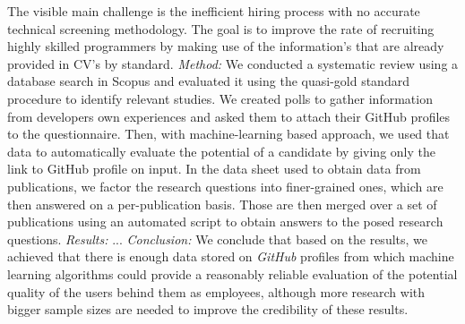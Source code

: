 {\newline
The visible main challenge is the inefficient hiring process with no accurate technical screening methodology. The goal is to improve the rate of recruiting highly skilled programmers by making use of the information's that are already provided in CV's by standard.
\newline
\noindent\textit{Method:} We conducted a systematic review using a database search in Scopus and evaluated it using the quasi-gold standard procedure to identify relevant studies.
We created polls to gather information from developers own experiences and asked them to attach their GitHub profiles to the questionnaire. Then, with machine-learning based approach, we used that data to automatically evaluate the potential of a candidate by giving only the link to GitHub profile on input.
In the data sheet used to obtain data from publications, we factor the research questions into finer-grained ones, which are then answered on a per-publication basis. Those are then merged over a set of publications using an automated script to obtain answers to the posed research questions.
\newline
\noindent\textit{Results:}
...
\newline
\noindent\textit{Conclusion:}
We conclude that based on the results, we achieved that there is enough data stored on \emph{GitHub} profiles from which machine learning algorithms could provide a reasonably reliable evaluation of the potential quality of the users behind them as employees, although more research with bigger sample sizes are needed to improve the credibility of these results.
}
